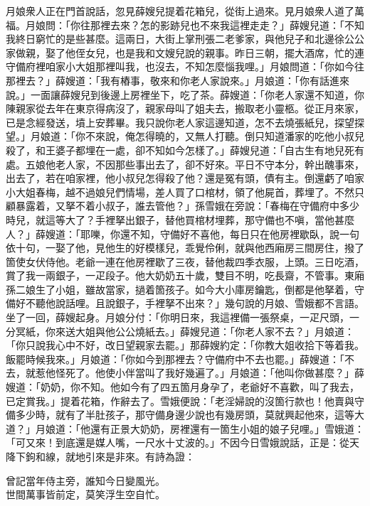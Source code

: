 月娘衆人正在門首說話，忽見薛嫂兒提着花箱兒，從街上過來。見月娘衆人道了萬福。月娘問：「你往那裡去來？怎的影跡兒也不來我這裡走走？」薛嫂兒道：「不知我終日窮忙的是些甚麼。這兩日，大街上掌刑張二老爹家，與他兒子和北邊徐公公家做親，娶了他侄女兒，也是我和文嫂兒說的親事。昨日三朝，擺大酒席，忙的連守備府裡咱家小大姐那裡叫我，也沒去，不知怎麼惱我哩。」月娘問道：「你如今往那裡去？」薛嫂道：「我有樁事，敬來和你老人家說來。」月娘道：「你有話進來說。」一面讓薛嫂兒到後邊上房裡坐下，吃了茶。薛嫂道：「你老人家還不知道，你陳親家從去年在東京得病沒了，親家母叫了姐夫去，搬取老小靈柩。從正月來家，已是念經發送，墳上安葬畢。我只說你老人家這邊知道，怎不去燒張紙兒，探望探望。」月娘道：「你不來說，俺怎得曉的，又無人打聽。{}倒只知道潘家的吃他小叔兒殺了，和王婆子都埋在一處，卻不知如今怎樣了。」薛嫂兒道：「自古生有地兒死有處。五娘他老人家，不因那些事出去了，卻不好來。平日不守本分，幹出醜事來，出去了，若在咱家裡，他小叔兒怎得殺了他？還是冤有頭，債有主。倒還虧了咱家小大姐春梅，越不過娘兒們情場，差人買了口棺材，領了他屍首，葬埋了。不然只顧暴露着，又拏不着小叔子，誰去管他？」孫雪娥在旁說：「春梅在守備府中多少時兒，就這等大了？手裡拏出銀子，替他買棺材埋葬，那守備也不嗔，當他甚麼人？」{}薛嫂道：「耶嚛，你還不知，守備好不喜他，每日只在他房裡歇臥，說一句依十句，一娶了他，見他生的好模樣兒，乖覺伶俐，就與他西廂房三間房住，撥了箇使女伏侍他。老爺一連在他房裡歇了三夜，替他裁四季衣服，上頭。三日吃酒，賞了我一兩銀子，一疋段子。他大奶奶五十歲，雙目不明，吃長齋，不管事。東廂孫二娘生了小姐，雖故當家，撾着箇孩子。如今大小庫房鑰匙，倒都是他拏着，守備好不聽他說話哩。且說銀子，手裡拏不出來？」{}幾句說的月娘、雪娥都不言語。坐了一回，薛嫂起身。月娘分付：「你明日來，我這裡備一張祭桌，一疋尺頭，一分冥紙，你來送大姐與他公公燒紙去。」薛嫂兒道：「你老人家不去？」月娘道：「你只說我心中不好，改日望親家去罷。」{}那薛嫂約定：「你教大姐收拾下等着我。飯罷時候我來。」月娘道：「你如今到那裡去？守備府中不去也罷。」薛嫂道：「不去，就惹他怪死了。他使小伴當叫了我好幾遍了。」月娘道：「他叫你做甚麼？」薛嫂道：「奶奶，你不知。他如今有了四五箇月身孕了，老爺好不喜歡，叫了我去，已定賞我。」提着花箱，作辭去了。雪娥便說：「老淫婦說的沒箇行款也！他賣與守備多少時，就有了半肚孩子，那守備身邊少說也有幾房頭，莫就興起他來，這等大道？」{}月娘道：「他還有正景大奶奶，房裡還有一箇生小姐的娘子兒哩。」雪娥道：「可又來！到底還是媒人嘴，一尺水十丈波的。」不因今日雪娥說話，正是：從天降下鉤和線，就地引來是非來。有詩為證：

\begin{myquote}
曾記當年侍主旁，誰知今日變風光。\\世間萬事皆前定，莫笑浮生空自忙。
\end{myquote}

